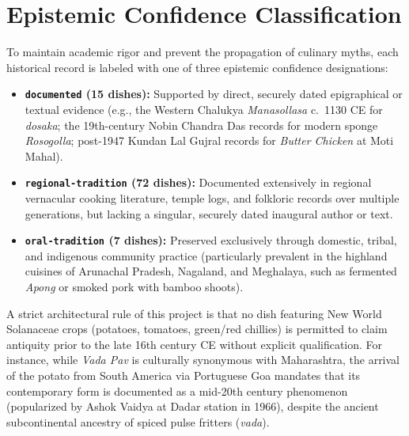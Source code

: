 \documentclass[11pt,a4paper]{report}
\begin{document}
\section{Epistemic Confidence Classification}
To maintain academic rigor and prevent the propagation of culinary myths, each historical record is labeled with one of three epistemic confidence designations:
\begin{itemize}
    \item \textbf{\texttt{documented} (15 dishes):} Supported by direct, securely dated epigraphical or textual evidence (e.g., the Western Chalukya \emph{Manasollasa} c.~1130 CE for \emph{dosaka}; the 19th-century Nobin Chandra Das records for modern sponge \emph{Rosogolla}; post-1947 Kundan Lal Gujral records for \emph{Butter Chicken} at Moti Mahal).
    \item \textbf{\texttt{regional-tradition} (72 dishes):} Documented extensively in regional vernacular cooking literature, temple logs, and folkloric records over multiple generations, but lacking a singular, securely dated inaugural author or text.
    \item \textbf{\texttt{oral-tradition} (7 dishes):} Preserved exclusively through domestic, tribal, and indigenous community practice (particularly prevalent in the highland cuisines of Arunachal Pradesh, Nagaland, and Meghalaya, such as fermented \emph{Apong} or smoked pork with bamboo shoots).
\end{itemize}

\begin{historicalnote}
A strict architectural rule of this project is that no dish featuring New World Solanaceae crops (potatoes, tomatoes, green/red chillies) is permitted to claim antiquity prior to the late 16th century CE without explicit qualification. For instance, while \emph{Vada Pav} is culturally synonymous with Maharashtra, the arrival of the potato from South America via Portuguese Goa mandates that its contemporary form is documented as a mid-20th century phenomenon (popularized by Ashok Vaidya at Dadar station in 1966), despite the ancient subcontinental ancestry of spiced pulse fritters (\emph{vada}).
\end{historicalnote}
\end{document}
